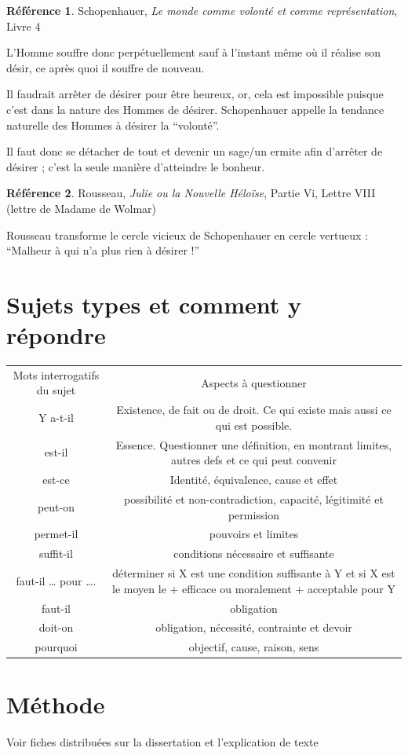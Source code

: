 \documentclass[french]{book}
\theoremstyle{definition}
\newtheorem*{refe}{Référence}
\begin{document}
\begin{refe}
	Schopenhauer, \textit{Le monde comme volonté et comme représentation}, Livre 4
\end{refe}



L’Homme souffre donc perpétuellement sauf à l’instant même où il réalise son désir, ce après quoi il souffre de nouveau.

Il faudrait arrêter de désirer pour être heureux, or, cela est impossible puisque c’est dans la nature des Hommes de désirer. Schopenhauer appelle la tendance naturelle des Hommes à désirer la “volonté”.

Il faut donc se détacher de tout et devenir un sage/un ermite afin d'arrêter de désirer ; c’est la seule manière d’atteindre le bonheur.

\begin{refe}
	Rousseau, \textit{Julie ou la Nouvelle Héloïse}, Partie Vi, Lettre VIII (lettre de Madame de Wolmar)
\end{refe}

Rousseau transforme le cercle vicieux de Schopenhauer en cercle vertueux :
“Malheur à qui n’a plus rien à désirer !”

\chapter{Sujets types et comment y répondre} 
\begin{tabular}{|c|c|}
	Mots interrogatifs du sujet&
	Aspects à questionner\\
	Y a-t-il&
	Existence, de fait ou de droit. Ce qui existe mais aussi ce qui est possible.\\
	est-il&
	Essence. Questionner une définition, en montrant limites, autres defs et ce qui peut convenir\\
	est-ce&
	Identité, équivalence, cause et effet\\
	peut-on&
	possibilité et non-contradiction, capacité, légitimité et permission\\
	permet-il&
	pouvoirs et limites\\
	suffit-il&
	conditions nécessaire et suffisante\\
	faut-il … pour ….&
	déterminer si X est une condition suffisante à Y et si X est le moyen le + efficace ou moralement + acceptable pour Y\\
	faut-il&
	obligation\\
	doit-on&
	obligation, nécessité, contrainte et devoir\\
	pourquoi&
	objectif, cause, raison, sens\\
\end{tabular}








\chapter{Méthode}
Voir fiches distribuées sur la dissertation et l’explication de texte


\backmatter
\end{document}
